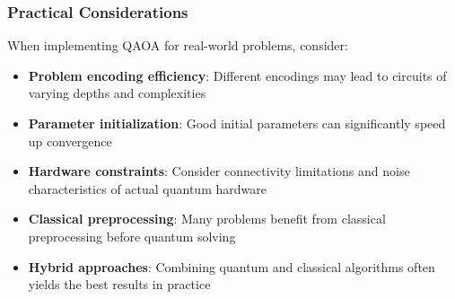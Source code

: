 \vspace{0.3cm}

\subsubsection*{Practical Considerations}

When implementing QAOA for real-world problems, consider:

\begin{itemize}
  \item \textbf{Problem encoding efficiency}: Different encodings may lead to
    circuits of varying depths and complexities

  \item \textbf{Parameter initialization}: Good initial parameters can
    significantly speed up convergence

  \item \textbf{Hardware constraints}: Consider connectivity limitations and
    noise characteristics of actual quantum hardware

  \item \textbf{Classical preprocessing}: Many problems benefit from
    classical preprocessing before quantum solving

  \item \textbf{Hybrid approaches}: Combining quantum and classical
    algorithms often yields the best results in practice
\end{itemize}


